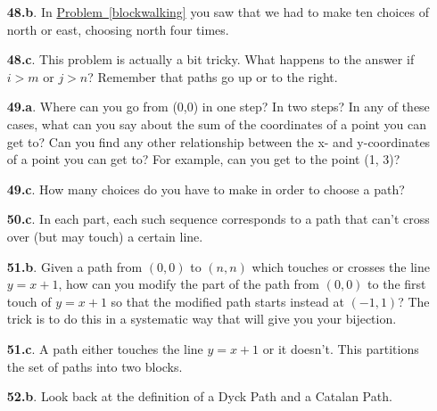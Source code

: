 \documentclass[10pt,]{book}
\theoremstyle{plain}
\theoremstyle{definition}
\theoremstyle{definition}
\numberwithin{equation}{chapter}
\newcommand{\gt}{>}
\begin{document}
\begin{itemize}[itemsep=1em]
\item[\textbf{48.b}.]\hypertarget{p-276}{}%
In \hyperref[blockwalking]{Problem~\ref{blockwalking}} you saw that we had to make ten choices of north or east, choosing north four times.%

\item[\textbf{48.c}.]\hypertarget{p-279}{}%
This problem is actually a bit tricky. What happens to the answer if \(i \gt m\) or \(j \gt n\)? Remember that paths go up or to the right.%

\item[\textbf{49.a}.]\hypertarget{p-283}{}%
Where can you go from (0,0) in one step? In two steps? In any of these cases, what can you say about the sum of the coordinates of a point you can get to? Can you find any other relationship between the x- and y-coordinates of a point you can get to? For example, can you get to the point (1, 3)?%

\item[\textbf{49.c}.]\hypertarget{p-288}{}%
How many choices do you have to make in order to choose a path?%

\item[\textbf{50.c}.]\hypertarget{p-296}{}%
In each part, each such sequence corresponds to a path that can't cross over (but may touch) a certain line.%

\item[\textbf{51.b}.]\hypertarget{p-302}{}%
Given a path from \((0, 0)\) to \((n, n)\) which touches or crosses the line \(y = x + 1\), how can you modify the part of the path from \((0, 0)\) to the first touch of \(y = x + 1\) so that the modified path starts instead at \((-1, 1)\)? The trick is to do this in a systematic way that will give you your bijection.%

\item[\textbf{51.c}.]\hypertarget{p-305}{}%
A path either touches the line \(y = x + 1\) or it doesn't. This partitions the set of paths into two blocks.%

\item[\textbf{52.b}.]\hypertarget{p-311}{}%
Look back at the definition of a Dyck Path and a Catalan Path.%


\end{itemize}
\end{document}
